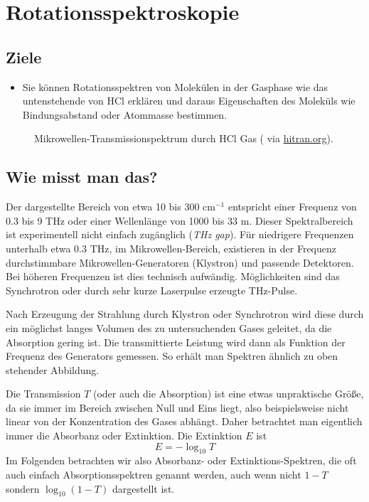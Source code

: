 
\chapter{Rotationsspektroskopie}



\section{Ziele}

\begin{itemize}
\item Sie können Rotationsspektren von Molekülen in der Gasphase wie das untenstehende von HCl erklären und daraus Eigenschaften des Moleküls wie Bindungsabstand oder Atommasse bestimmen.
\end{itemize}

\begin{figure}
\caption{Mikrowellen-Transmissionspektrum durch  HCl Gas  (\cite{Li_2011_hcl} via \href{https://hitran.org}{hitran.org}).
\label{fig:rot_hcl}}
\end{figure}



\section{Wie misst man das?}

Der dargestellte Bereich  von etwa 10 bis 300 cm$^{-1}$ entspricht einer Frequenz von 0.3 bis 9 THz oder einer Wellenlänge von 1000 bis 33 \textmu m. Dieser Spektralbereich ist experimentell nicht einfach zugänglich (\emph{THz gap}). Für niedrigere Frequenzen unterhalb etwa 0.3 THz, im Mikrowellen-Bereich, existieren in der Frequenz durchstimmbare  Mikrowellen-Generatoren (Klystron) und passende Detektoren. Bei höheren Frequenzen ist dies technisch aufwändig. Möglichkeiten sind das Synchrotron oder durch sehr kurze Laserpulse erzeugte THz-Pulse.

Nach Erzeugung der Strahlung durch Klystron oder Synchrotron wird diese durch ein möglichst langes Volumen des zu untersuchenden Gases geleitet, da die Absorption gering ist. Die transmittierte Leistung wird dann als Funktion der Frequenz des Generators gemessen. So erhält man  Spektren ähnlich zu oben stehender Abbildung.

Die Transmission $T$ (oder auch die Absorption) ist eine etwas unpraktische Größe, da sie immer im Bereich zwischen Null und Eins liegt, also beispielsweise nicht linear von der Konzentration des Gases abhängt. Daher betrachtet man eigentlich immer die Absorbanz oder Extinktion. Die Extinktion $E$ ist
%
\begin{equation}
 E = - \log_{10} T
\end{equation}
%
Im Folgenden betrachten wir also Absorbanz- oder Extinktions-Spektren, die oft auch einfach Absorptionsspektren genannt werden, auch wenn nicht $1-T$ sondern $\log_{10} ( 1- T)$ dargestellt ist.


